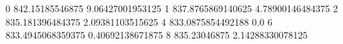 0 842.15185546875 9.06427001953125
1 837.8765869140625 4.78900146484375
2 835.181396484375 2.09381103515625
4 833.0875854492188 0.0
6 833.4945068359375 0.40692138671875
8 835.23046875 2.14288330078125

